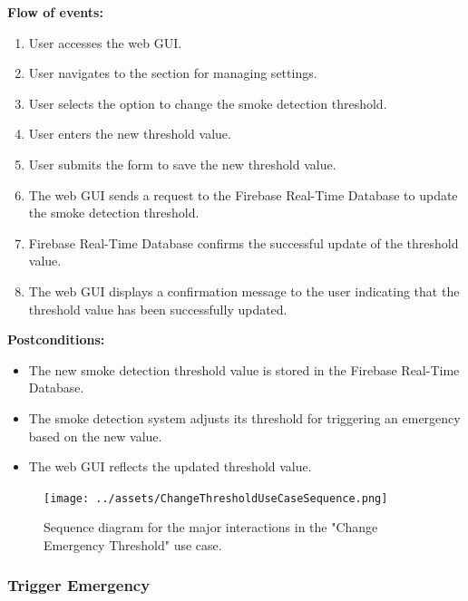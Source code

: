 \textbf{Flow of events:}
\begin{enumerate}
    \item User accesses the web GUI.
    \item User navigates to the section for managing settings.
    \item User selects the option to change the smoke detection threshold.
    \item User enters the new threshold value.
    \item User submits the form to save the new threshold value.
    \item The web GUI sends a request to the Firebase Real-Time Database to update the smoke detection threshold.
    \item Firebase Real-Time Database confirms the successful update of the threshold value.
    \item The web GUI displays a confirmation message to the user indicating that the threshold value has been successfully
          updated.
\end{enumerate}

\textbf{Postconditions:}
\begin{itemize}
    \item The new smoke detection threshold value is stored in the Firebase Real-Time Database.
    \item The smoke detection system adjusts its threshold for triggering an emergency based on the new value.
    \item The web GUI reflects the updated threshold value.
\end{itemize}

\begin{figure}[H]
    \centering
    \texttt{[image: ../assets/ChangeThresholdUseCaseSequence.png]}
    \caption{Sequence diagram for the major interactions in the "Change Emergency Threshold" use case.}
\end{figure}

\subsubsection{Trigger Emergency}

